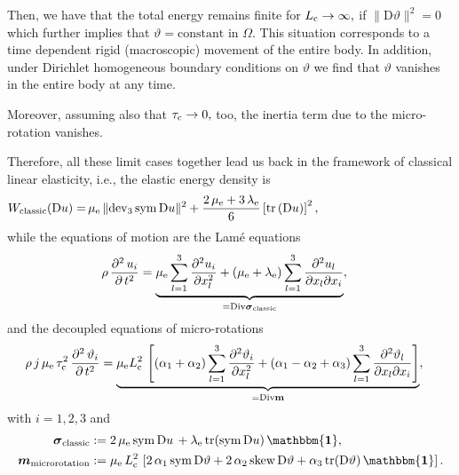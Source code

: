 \documentclass[10pt]{article}
\newcommand{\id}{{\mathbf{\mathbbm{1}}}}
\newcommand{\tr}{{\rm tr}}
\newcommand{\dev}{{\rm dev}}
\newcommand{\sym}{{\rm sym}}
\newcommand{\skw}{{\rm skew}}
\def\dd{\displaystyle}
\def\dd{\displaystyle}
\begin{document}
Then, we have that the total energy   remains finite for
$
	L_{\rm c}\to \infty,
$
 if 
$ \|\mathrm{D}\vartheta\|^2=0$ 
		 which further implies that $ 
\vartheta=\textrm{constant}$  \textrm{in} $\Omega.$
This situation corresponds to a time dependent rigid (macroscopic) movement of the entire body. In addition, under Dirichlet homogeneous boundary conditions on $ \vartheta$ we find that $ \vartheta$ vanishes in the entire body at any time.


Moreover, assuming also that 
$ \tau_{\rm c}\to 0,$ too, the inertia term due to the micro-rotation vanishes. 

Therefore, all these limit cases together  lead us   back in the framework of classical linear elasticity, i.e., the  elastic energy density is
\begin{align}
	W_{\rm classic}(\mathrm{D}u )=&\,  \mu_{\rm e} \,\lVert \dev_3\, \sym\,\mathrm{D}u \rVert ^{2}+\frac{2\,\mu_{\rm e} +3\,\lambda_{\rm e} }{6}\left[\mathrm{tr} \left(\mathrm{D}u \right)\right]^{2},\qquad \qquad \qquad \qquad \qquad 
\end{align}
while the equations of motion are the Lam\'e equations
\begin{align}\label{PDE1}
	\rho\,\frac{\partial^2 \,u_i}{\partial\, t^2}&=\underbrace{\mu_{\rm e} \dd\sum_{l=1}^3\frac{\partial^2 u_i }{\partial x_l^2}+(\mu_{\rm e} +\lambda_{\rm e} )\dd\sum_{l=1}^3\frac{\partial^2 u_l }{\partial x_l\partial x_i}}_{={\rm Div}\boldsymbol{\sigma}_{\rm classic}},
\end{align}
and the decoupled equations of micro-rotations
\begin{align}\label{PDE2}
		\rho\, j\,\mu_{\rm e}\,\tau_{\rm c}^2\,\frac{\partial^2 \,\vartheta_i}{\partial\, t^2}&=\underbrace{{\mu_{\rm e}L_{\rm c}^2}\,\left[(\alpha_1+\alpha_2)\dd\sum_{l=1}^3\frac{\partial^2 \vartheta _i }{\partial x_l^2}+(\alpha_1-\alpha_2+\alpha_3)\dd\sum_{l=1}^3\frac{\partial^2 \vartheta_l }{\partial x_l\partial x_i}\right]}_{={\rm Div}\mathbf{ m}}, \notag
	\end{align}
	with $i=1,2,3$ and
\begin{align}
	\boldsymbol{\sigma}_{\rm classic}&:=2\,\mu_{\rm e}\,\sym \,{\rm D}u \, +\lambda_{\rm e} \,\tr (\sym \,{\rm D}u)\, \id,\\
		\boldsymbol{m}_{\rm microrotation}&:={\mu_{\rm e}\,L_{\rm c}^2}\,\left[2\,{\alpha_1}\, \sym\,{\rm D}\vartheta +2\,{\alpha_2}\,\skw\, {\rm D}\vartheta+\alpha_3\,\tr({\rm D}\vartheta)\,\id\right].\notag
\end{align}
\end{document}
